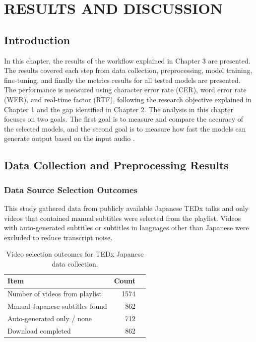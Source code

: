 \chapter{RESULTS AND DISCUSSION}
\label{ch:results}

\section{Introduction}

In this chapter, the results of the workflow explained in Chapter 3 are presented. The results covered each step from data collection, preprocessing, model training, fine-tuning, and finally the metrics results for all tested models are presented. The performance is measured using character error rate (CER), word error rate (WER), and real-time factor (RTF), following the research objective explained in Chapter 1 and the gap identified in Chapter 2. The analysis in this chapter focuses on two goals. The first goal is to measure and compare the accuracy of the selected models, and the second goal is to measure how fast the models can generate output based on the input audio \parencite{ando2021}. 


\section{Data Collection and Preprocessing Results}
\label{sec:data_results}

\subsection{Data Source Selection Outcomes}
This study gathered data from publicly available Japanese TEDx talks and only videos that contained manual subtitles were selected from the playlist. Videos with auto-generated subtitles or subtitles in languages other than Japanese were excluded to reduce transcript noise.

\begin{table}[H]
\centering
\caption{Video selection outcomes for TEDx Japanese data collection.}
\label{tab:video_selection}
{\small
\setlength{\tabcolsep}{6pt}
\renewcommand{\arraystretch}{1.2}
\begin{tabular}{lrr}
\hline
\textbf{Item} & \textbf{Count}  \\
\hline
Number of videos from playlist & {1574}  \\
Manual Japanese subtitles found & {862} \\
Auto-generated only / none & {712}  \\
Download completed & {862} \\
\hline
\end{tabular}}
\end{table}

